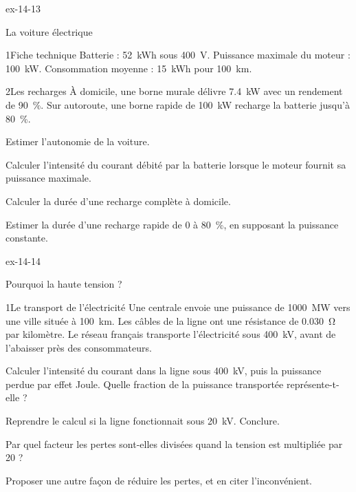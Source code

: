 \begin{blocLivre}{ex-14-13}
\begin{exercice}[3]{La voiture électrique}
\begin{docu}{1}{Fiche technique}
Batterie : \qty{52}{kWh} sous \qty{400}{V}. Puissance maximale du moteur : \qty{100}{kW}. Consommation moyenne : \qty{15}{kWh} pour \qty{100}{km}.
\end{docu}
\begin{docu}{2}{Les recharges}
À domicile, une borne murale délivre \qty{7,4}{kW} avec un rendement de \qty{90}{\percent}. Sur autoroute, une borne rapide de \qty{100}{kW} recharge la
batterie jusqu'à \qty{80}{\percent}.
\end{docu}
\begin{questions}
\item Estimer l'autonomie de la voiture.
\item Calculer l'intensité du courant débité par la batterie lorsque le moteur fournit sa puissance maximale.
\item Calculer la durée d'une recharge complète à domicile.
\item \initiative Estimer la durée d'une recharge rapide de 0 à \qty{80}{\percent}, en supposant la puissance constante.
\end{questions}
\end{exercice}
\end{blocLivre}
\begin{blocLivre}{ex-14-14}
\begin{exercice}[3]{Pourquoi la haute tension ?}
\begin{docu}{1}{Le transport de l'électricité}
Une centrale envoie une puissance de \qty{1000}{MW} vers une ville située à \qty{100}{km}. Les câbles de la ligne ont une résistance de
\qty{0,030}{\ohm} par kilomètre. Le réseau français transporte l'électricité sous \qty{400}{kV}, avant de l'abaisser près des consommateurs.
\end{docu}
\begin{questions}
\item Calculer l'intensité du courant dans la ligne sous \qty{400}{kV}, puis la puissance perdue par effet Joule. Quelle fraction de la puissance
transportée représente-t-elle ?
\item Reprendre le calcul si la ligne fonctionnait sous \qty{20}{kV}. Conclure.
\item \initiative Par quel facteur les pertes sont-elles divisées quand la tension est multipliée par 20 ?
\item Proposer une autre façon de réduire les pertes, et en citer l'inconvénient.
\end{questions}
\end{exercice}
\end{blocLivre}
